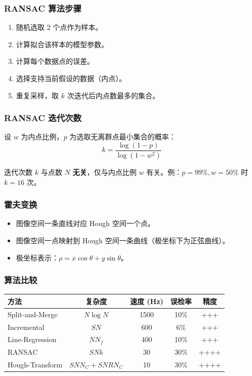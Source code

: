\documentclass[11pt,a4paper]{article}
\begin{document}
\subsubsection*{RANSAC 算法步骤}
\begin{enumerate}
  \item 随机选取 2 个点作为样本。
  \item 计算拟合该样本的模型参数。
  \item 计算每个数据点的误差。
  \item 选择支持当前假设的数据（内点）。
  \item 重复采样，取 $k$ 次迭代后内点数最多的集合。
\end{enumerate}

\subsubsection*{RANSAC 迭代次数}
设 $w$ 为内点比例，$p$ 为选取无离群点最小集合的概率：
\[
\boxed{\;k=\frac{\log(1-p)}{\log(1-w^2)}\;}
\]
\begin{notebox}
迭代次数 $k$ 与点数 $N$ \textbf{无关}，仅与内点比例 $w$ 有关。例：$p=99\%,w=50\%$ 时 $k=16$ 次。
\end{notebox}

\subsubsection*{霍夫变换}
\begin{itemize}
  \item 图像空间一条直线对应 Hough 空间一个点。
  \item 图像空间一点映射到 Hough 空间一条曲线（极坐标下为正弦曲线）。
  \item 极坐标表示：$\rho = x\cos\theta + y\sin\theta$。
\end{itemize}

\subsubsection*{算法比较}
\begin{center}
\begin{tabular}{l|c|c|c|c}
\toprule
方法 & 复杂度 & 速度 (Hz) & 误检率 & 精度 \\
\midrule
Split-and-Merge & $N\log N$ & 1500 & 10\% & +++ \\
Incremental & $SN$ & 600 & 6\% & +++ \\
Line-Regression & $NN_f$ & 400 & 10\% & +++ \\
RANSAC & $SNk$ & 30 & 30\% & ++++ \\
Hough-Transform & $SNN_C+SNRN_C$ & 10 & 30\% & ++++ \\
\bottomrule
\end{tabular}
\end{center}
\end{document}
